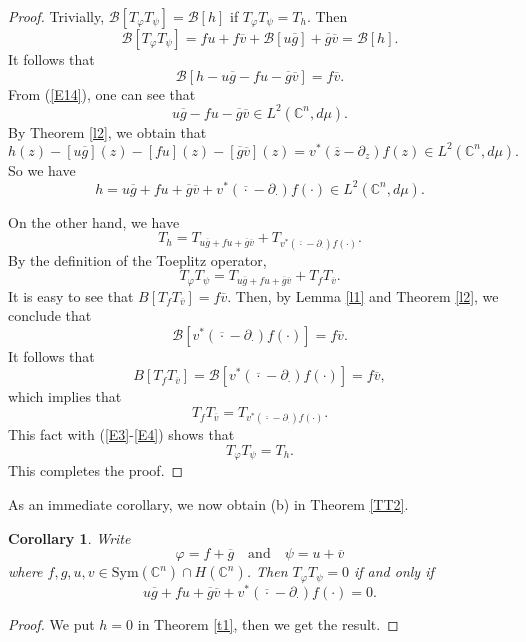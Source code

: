 \documentclass[11pt,reqno]{amsart}
\newtheorem{cor}[theorem]{Corollary}
\theoremstyle{definition}
\begin{document}
\begin{proof}
Trivially, $\mathcal{B}[T_\varphi T_\psi]=\mathcal{B}[h]$ if $T_\varphi T_\psi=T_h$. Then
$$\mathcal{B}[T_\varphi T_\psi]=fu+f\overline{v}+\mathcal{B}[u\overline{g}]+\overline{g}\overline{v}=\mathcal{B}[h].$$
It follows that
$$\mathcal{B}[h-u\overline{g}-fu-\overline{g}\overline{v}]=f\overline{v}.$$
From (\ref{E14}), one can see that $$u\overline{g}-fu-\overline{g}\overline{v}\in  L^2(\mathbb{C}^n,d\mu).$$
By Theorem \ref{l2}, we obtain that
$$h(z)-[u\overline{g}](z)-[fu](z)-[\overline{g}\overline{v}](z)=v^*(\overline{z}-\partial_z)f(z)\in L^2(\mathbb{C}^n,d\mu).$$
So we have $$h=u\overline{g}+fu+\overline{g}\overline{v}+v^*({\overline{\cdot}}-\partial_\cdot) f(\cdot)\in L^2(\mathbb{C}^n,d\mu).$$

On the other hand, we have
\begin{equation}\label{E3}
T_h=T_{u\overline{g}+fu+\overline{g}\overline{v}}+T_{v^*({\overline{\cdot}}-\partial_\cdot) f(\cdot)}.
\end{equation}
By the definition of the Toeplitz operator,
\begin{equation}\label{E4}
T_{\varphi}T_{\psi}=T_{u\overline{g}+fu+\overline{g}\overline{v}}+T_{f}T_{\overline{v}}.
\end{equation}
It is easy to see that $B[T_fT_{\overline{v}}]=f\overline{v}.$  Then, by Lemma \ref{l1}  and Theorem \ref{l2}, we conclude that
$$\mathcal{B}[v^*(\overline{\cdot}-\partial_\cdot)f(\cdot)]=f\overline{v}.$$
It follows that $$B[T_fT_{\overline{v}}]=\mathcal{B}[v^*(\overline{\cdot}-\partial_\cdot)f(\cdot)]=f\overline{v},$$
which implies that $$T_fT_{\overline{v}}=T_{v^*({\overline{\cdot}}-\partial_\cdot) f(\cdot)}.$$
This fact with (\ref{E3}-\ref{E4}) shows that
$$T_{\varphi}T_{\psi}=T_h.$$ This completes the proof.
\end{proof}
As an immediate corollary, we now obtain (b) in Theorem \ref{TT2}.
\begin{cor}\label{c1}
Write
$$\varphi=f+\overline{g}\quad\text{and}\quad\psi=u+\overline{v}$$
where $f,g,u,v\in \text{Sym}(\mathbb{C}^n)\cap H(\mathbb{C}^n)$.
Then $T_\varphi T_\psi=0$ if and only if
\begin{equation*}
u\overline{g}+fu+\overline{g}\overline{v}+v^*({\overline{\cdot}}-\partial_\cdot) f(\cdot)=0.
\end{equation*}
\end{cor}
\begin{proof}
We put $h=0$ in Theorem \ref{t1}, then we get the result.
\end{proof}
\end{document}
